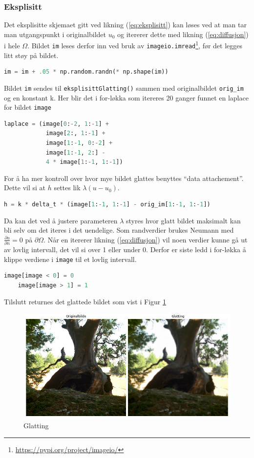 \subsubsection{Eksplisitt}
Det eksplisitte skjemaet gitt ved likning (\ref{eq:eksplisitt}) kan løses ved at man tar man utgangspunkt i originalbildet $u_0$ og itererer dette med likning (\ref{eq:diffusjon}) i hele $\Omega$. Bildet \texttt{im} leses derfor inn ved bruk av \texttt{imageio.imread}\footnote{\url{https://pypi.org/project/imageio/}}, før det legges litt støy på bildet.
\begin{lstlisting}[language=Python]
    im = im + .05 * np.random.randn(* np.shape(im))
\end{lstlisting}
Bildet \texttt{im} sendes til \texttt{eksplisittGlatting()} sammen med originalbildet  \texttt{orig\_im} og en konstant k. Her blir det i for-løkka som itereres 20 ganger funnet en laplace for bildet \texttt{image}
\begin{lstlisting}[language=Python]
    laplace = (image[0:-2, 1:-1] + 
            image[2:, 1:-1] +
            image[1:-1, 0:-2] +
            image[1:-1, 2:] -
            4 * image[1:-1, 1:-1])
\end{lstlisting}
For å ha mer kontroll over hvor mye bildet glattes benyttes ``data attachement''. Dette vil si at $h$ settes lik $\lambda(u-u_0)$. 
\begin{lstlisting}[language=Python]
    h = k * delta_t * (image[1:-1, 1:-1] - orig_im[1:-1, 1:-1])
\end{lstlisting}
Da kan det ved å justere parameteren $\lambda$ styres hvor glatt bildet maksimalt kan bli selv om det iteres i det uendelige. Som randverdier brukes Neumann med $\frac{\partial u} {\partial n} = 0$ på $\partial \Omega$. Når en itererer likning (\ref{eq:diffusjon}) vil noen verdier kunne gå ut av lovlig intervall, det vil si over 1 eller under 0. Derfor er siste ledd i for-løkka å klippe verdiene i \texttt{image} til et lovlig intervall.
\begin{lstlisting}[language=Python]
    image[image < 0] = 0
    image[image > 1] = 1
\end{lstlisting}
Tilslutt returnes det glattede bildet som vist i Figur \ref{fig:glattingEks}
\begin{figure}
\begin{center}
    \includegraphics[width=0.9\columnwidth]{bilder/Glatting/glattingEksplisitt.jpg}
    \caption{Glatting~ \label{fig:glattingEks}}
\end{center}
\end{figure}

